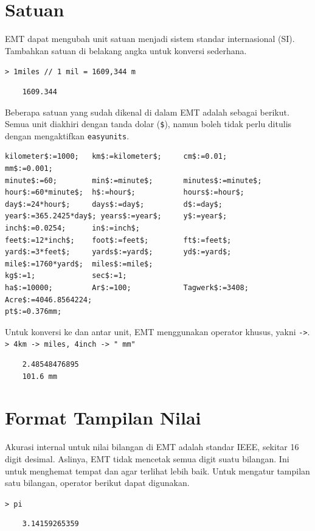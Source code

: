 \documentclass[11pt, a4paper]{article}
\newcommand{\emtcmd}[1]{\noindent\texttt{\textcolor{emtcommand}{>}\ #1}\par\smallskip}
\begin{document}
\noindent\hrulefill

\section*{Satuan}

EMT dapat mengubah unit satuan menjadi sistem standar internasional (SI). Tambahkan satuan di belakang angka untuk konversi sederhana.

\emtcmd{1miles \textcolor{emtcomment}{// 1 mil = 1609,344 m}}
\begin{verbatim}
    1609.344
\end{verbatim}

Beberapa satuan yang sudah dikenal di dalam EMT adalah sebagai berikut. Semua unit diakhiri dengan tanda dolar (\texttt{\$}), namun boleh tidak perlu ditulis dengan mengaktifkan \texttt{easyunits}.

\begin{verbatim}
kilometer$:=1000;   km$:=kilometer$;     cm$:=0.01;         mm$:=0.001;
minute$:=60;        min$:=minute$;       minutes$:=minute$;
hour$:=60*minute$;  h$:=hour$;           hours$:=hour$;
day$:=24*hour$;     days$:=day$;         d$:=day$;
year$:=365.2425*day$; years$:=year$;     y$:=year$;
inch$:=0.0254;      in$:=inch$;
feet$:=12*inch$;    foot$:=feet$;        ft$:=feet$;
yard$:=3*feet$;     yards$:=yard$;       yd$:=yard$;
mile$:=1760*yard$;  miles$:=mile$;
kg$:=1;             sec$:=1;
ha$:=10000;         Ar$:=100;            Tagwerk$:=3408;     Acre$:=4046.8564224;
pt$:=0.376mm;
\end{verbatim}

Untuk konversi ke dan antar unit, EMT menggunakan operator khusus, yakni \texttt{->}.
\emtcmd{4km -> miles, 4inch -> " mm"}
\begin{verbatim}
    2.48548476895
    101.6 mm
\end{verbatim}

\section*{Format Tampilan Nilai}

Akurasi internal untuk nilai bilangan di EMT adalah standar IEEE, sekitar 16 digit desimal. Aslinya, EMT tidak mencetak semua digit suatu bilangan. Ini untuk menghemat tempat dan agar terlihat lebih baik. Untuk mengatur tampilan satu bilangan, operator berikut dapat digunakan.

\emtcmd{pi}
\begin{verbatim}
    3.14159265359
\end{verbatim}
\end{document}
